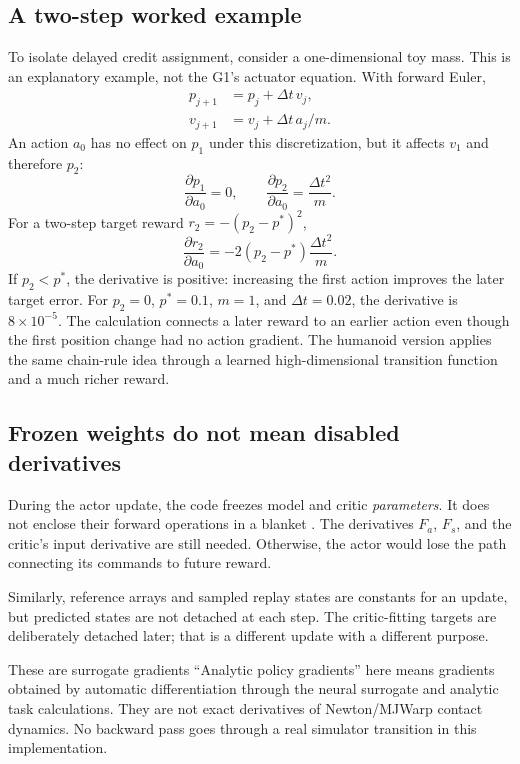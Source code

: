 \documentclass[11pt,a4paper]{article}
\newcommand{\code}[1]{\texttt{\small\detokenize{#1}}}
\begin{document}
\subsection{A two-step worked example}
To isolate delayed credit assignment, consider a one-dimensional toy mass. This
is an explanatory example, not the G1's actuator equation. With forward Euler,
\begin{align}
p_{j+1}&=p_j+\Delta t\,v_j,\\
v_{j+1}&=v_j+\Delta t\,a_j/m.
\end{align}
An action $a_0$ has no effect on $p_1$ under this discretization, but it affects
$v_1$ and therefore $p_2$:
\begin{equation}
\frac{\partial p_1}{\partial a_0}=0,\qquad
\frac{\partial p_2}{\partial a_0}=\frac{\Delta t^2}{m}.
\end{equation}
For a two-step target reward $r_2=-(p_2-p^*)^2$,
\begin{equation}
\frac{\partial r_2}{\partial a_0}
=-2(p_2-p^*)\frac{\Delta t^2}{m}.
\end{equation}
If $p_2<p^*$, the derivative is positive: increasing the first action improves
the later target error. For $p_2=0$, $p^*=0.1$, $m=1$, and $\Delta t=0.02$,
the derivative is $8\times10^{-5}$. The calculation connects a later reward to
an earlier action even though the first position change had no action gradient.
The humanoid version applies the same chain-rule idea through a learned
high-dimensional transition function and a much richer reward.

\subsection{Frozen weights do not mean disabled derivatives}
During the actor update, the code freezes model and critic \emph{parameters}.
It does not enclose their forward operations in a blanket \code{no_grad()}.
The derivatives $F_a$, $F_s$, and the critic's input derivative are still needed.
Otherwise, the actor would lose the path connecting its commands to future reward.

Similarly, reference arrays and sampled replay states are constants for an
update, but predicted states are not detached at each step. The critic-fitting
targets are deliberately detached later; that is a different update with a
different purpose.

\begin{caution}{These are surrogate gradients}
``Analytic policy gradients'' here means gradients obtained by automatic
differentiation through the neural surrogate and analytic task calculations.
They are not exact derivatives of Newton/MJWarp contact dynamics. No backward
pass goes through a real simulator transition in this implementation.
\end{caution}
\end{document}
